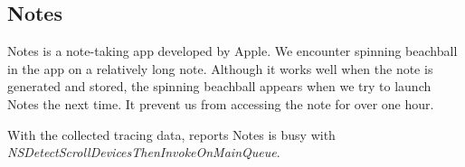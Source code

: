 \subsection{Notes}

Notes is a note-taking app developed by Apple. We encounter spinning beachball
in the app on a relatively long note. Although it works well when the note is
generated and stored, the spinning beachball appears when we try to launch Notes
the next time. It prevent us from accessing the note for over one hour.

With the collected tracing data, \xxx reports Notes is busy with
\textit{NSDetectScrollDevicesThenInvokeOnMainQueue}.

